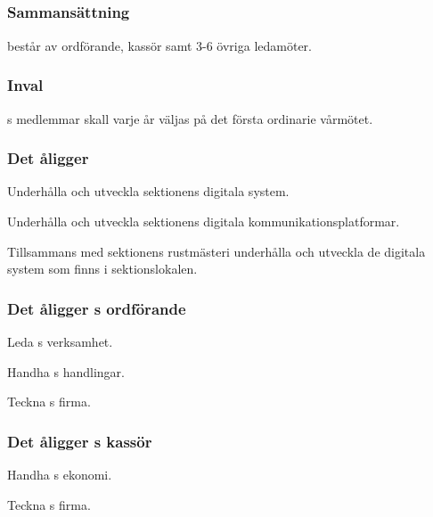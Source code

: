 \subsection{\DIGITFULL}
\subsubsection{Sammansättning}
\DIGIT{} består av ordförande, kassör samt 3-6 övriga ledamöter.

\subsubsection{Inval}
\DIGIT{}s medlemmar skall varje år väljas på det första ordinarie vårmötet.

\subsubsection{Det åligger \DIGIT}
\begin{att}
	\item Underhålla och utveckla sektionens digitala system.
	\item Underhålla och utveckla sektionens digitala kommunikationsplatformar.
	\item Tillsammans med sektionens rustmästeri underhålla och utveckla de digitala system som finns i sektionslokalen.
\end{att}

\subsubsection{Det åligger \DIGIT{}s ordförande}
\begin{att}
	\item Leda \DIGIT{}s verksamhet.
	\item Handha \DIGIT{}s handlingar.
	\item Teckna \DIGIT{}s firma.
\end{att}

\subsubsection{Det åligger \DIGIT{}s kassör}
\begin{att}
	\item Handha \DIGIT{}s ekonomi.
	\item Teckna \DIGIT{}s firma.
\end{att}